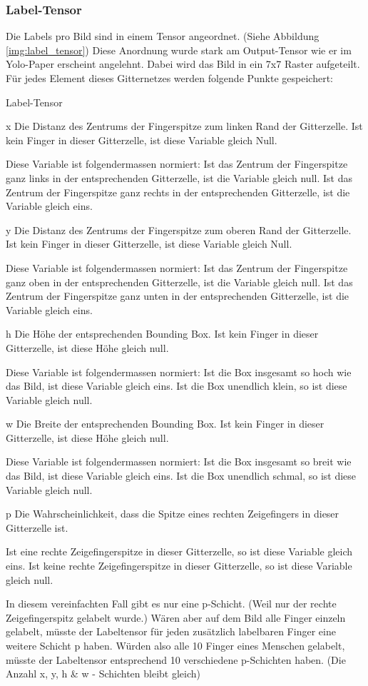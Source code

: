 \subsubsection{Label-Tensor}
\label{chapter:label_tensor}
Die Labels pro Bild sind in einem Tensor angeordnet. 
(Siehe Abbildung \ref{img:label_tensor})
Diese Anordnung wurde stark am Output-Tensor wie er im Yolo-Paper \cite{yolo} erscheint angelehnt.
Dabei wird das Bild in ein 7x7 Raster aufgeteilt.
Für jedes Element dieses Gitternetzes werden folgende Punkte gespeichert:
\begin{labeling}{Label-Tensor}
\item[x] Die Distanz des Zentrums der Fingerspitze zum linken Rand der Gitterzelle.
Ist kein Finger in dieser Gitterzelle, ist diese Variable gleich Null.

Diese Variable ist folgendermassen normiert: 
Ist das Zentrum der Fingerspitze ganz links in der entsprechenden Gitterzelle, ist die Variable gleich null.
Ist das Zentrum der Fingerspitze ganz rechts in der entsprechenden Gitterzelle, ist die Variable gleich eins.
\item[y] Die Distanz des Zentrums der Fingerspitze zum oberen Rand der Gitterzelle.
Ist kein Finger in dieser Gitterzelle, ist diese Variable gleich Null. 

Diese Variable ist folgendermassen normiert:
Ist das Zentrum der Fingerspitze ganz oben in der entsprechenden Gitterzelle, ist die Variable gleich null.
Ist das Zentrum der Fingerspitze ganz unten in der entsprechenden Gitterzelle, ist die Variable gleich eins.
\item[h] Die Höhe der entsprechenden Bounding Box.
Ist kein Finger in dieser Gitterzelle, ist diese Höhe gleich null.

Diese Variable ist folgendermassen normiert:
Ist die Box insgesamt so hoch wie das Bild, ist diese Variable gleich eins. 
Ist die Box \grqq{}unendlich\grqq{} klein, so ist diese Variable gleich null.
\item[w] Die Breite der entsprechenden Bounding Box.
Ist kein Finger in dieser Gitterzelle, ist diese Höhe gleich null.

Diese Variable ist folgendermassen normiert:
Ist die Box insgesamt so breit wie das Bild, ist diese Variable gleich eins.
Ist die Box \grqq{}unendlich\grqq{} schmal, so ist diese Variable gleich null.
\item[p] Die Wahrscheinlichkeit, dass die Spitze eines rechten Zeigefingers in dieser Gitterzelle ist. 

Ist eine rechte Zeigefingerspitze in dieser Gitterzelle, so ist diese Variable gleich eins.
Ist keine rechte Zeigefingerspitze in dieser Gitterzelle, so ist diese Variable gleich null.

In diesem vereinfachten Fall gibt es nur eine p-Schicht.
(Weil nur der rechte Zeigefingerspitz gelabelt wurde.)
Wären aber auf dem Bild alle Finger einzeln gelabelt, müsste der Labeltensor für jeden zusätzlich labelbaren Finger eine weitere Schicht p haben. 
Würden also alle 10 Finger eines Menschen gelabelt, müsste der Labeltensor entsprechend 10 verschiedene p-Schichten haben.
(Die Anzahl x, y, h \& w - Schichten bleibt gleich) 
\end{labeling}

